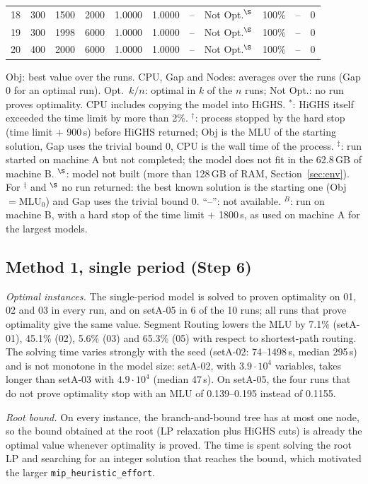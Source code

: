\documentclass[conference]{IEEEtran}
\newcommand{\MLU}{\mathrm{MLU}}
\begin{document}
\begin{table}[t]
\begin{tabular}{@{}rrrrrrrlrrr@{}}
18 & 300 & 1500 & 2000 & 1.0000 & 1.0000 & -- & Not Opt.$^\S$ & 100\% & -- & 0\\
19 & 300 & 1998 & 6000 & 1.0000 & 1.0000 & -- & Not Opt.$^\S$ & 100\% & -- & 0\\
20 & 400 & 2000 & 6000 & 1.0000 & 1.0000 & -- & Not Opt.$^\S$ & 100\% & -- & 0\\
\bottomrule
\end{tabular}
\par\smallskip\parbox{0.97\textwidth}{\scriptsize Obj: best value over the runs. CPU, Gap and Nodes: averages over the runs (Gap 0 for an optimal run). Opt.~$k/n$: optimal in $k$ of the $n$ runs; Not Opt.: no run proves optimality. CPU includes copying the model into HiGHS. $^*$: HiGHS itself exceeded the time limit by more than 2\%. $^\dagger$: process stopped by the hard stop (time limit $+$ 900\,s) before HiGHS returned; Obj is the MLU of the starting solution, Gap uses the trivial bound 0, CPU is the wall time of the process. $^\ddagger$: run started on machine A but not completed; the model does not fit in the 62.8\,GB of machine B. $^\S$: model not built (more than 128\,GB of RAM, Section~\ref{sec:env}). For $^\ddagger$ and $^\S$ no run returned: the best known solution is the starting one (Obj $=\MLU_0$) and Gap uses the trivial bound 0. ``--'': not available. $^{B}$: run on machine B, with a hard stop of the time limit $+$ 1800\,s, as used on machine A for the largest models.}
\end{table}

\subsection{Method 1, single period (Step 6)}
\emph{Optimal instances.} The single-period model is solved to proven optimality on 01, 02 and 03 in every run, and on setA-05 in 6 of the 10 runs; all runs that prove optimality give the same value. Segment Routing lowers the MLU by 7.1\% (setA-01), 45.1\% (02), 5.6\% (03) and 65.3\% (05) with respect to shortest-path routing. The solving time varies strongly with the seed (setA-02: 74--1498\,s, median 295\,s) and is not monotone in the model size: setA-02, with $3.9\cdot10^4$ variables, takes longer than setA-03 with $4.9\cdot10^4$ (median 47\,s). On setA-05, the four runs that do not prove optimality stop with an MLU of 0.139--0.195 instead of 0.1155.

\emph{Root bound.} On every instance, the branch-and-bound tree has at most one node, so the bound obtained at the root (LP relaxation plus HiGHS cuts) is already the optimal value whenever optimality is proved. The time is spent solving the root LP and searching for an integer solution that reaches the bound, which motivated the larger \texttt{mip\_heuristic\_effort}.
\end{document}
